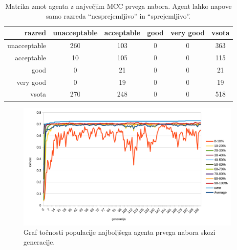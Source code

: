 \begin{table}[H]
    \centering
    \caption{Matrika zmot agenta z največjim MCC prvega nabora. Agent lahko napove samo razreda \enquote{nesprejemljivo} in \enquote{sprejemljivo}.}
    \begin{tabular}{||rccccc||}
        \hline
        razred       & unacceptable & acceptable & good & very good & vsota \\ \hline
        unacceptable & 260          & 103        & 0    & 0         & 363   \\ \hline
        acceptable   & 10           & 105        & 0    & 0         & 115   \\ \hline
        good         & 0            & 21         & 0    & 0         & 21    \\ \hline
        very good    & 0            & 19         & 0    & 0         & 19    \\ \hline
        vsota        & 270          & 248        & 0    & 0         & 518   \\ \hline
    \end{tabular}
    \label{tab:car_mcc_1}
\end{table}

\begin{figure}[H]
    \begin{center}
        \includegraphics[width=13cm]{car/1/acc}
    \end{center}
    \caption{Graf točnosti populacije najboljšega agenta prvega nabora skozi generacije.}
    \label{fig:car_acc_1}
\end{figure}

